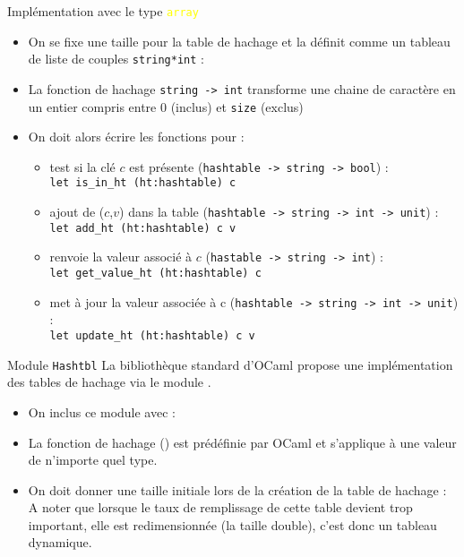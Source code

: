 \documentclass[10pt]{beamer}
\begin{document}
\begin{frame}{\Ctitle}{\stitle}
	\begin{block}{Implémentation avec le type \textcolor{yellow}{\tt array}}
		\begin{itemize}
			\item<1->On se fixe une taille pour la table de hachage et la définit comme un tableau de liste de couples \texttt{string*int} :
			\item<2-> La fonction de hachage {\tt string -> int} transforme une chaine de caractère en un entier compris entre 0 (inclus) et {\tt size} (exclus)
			\item<3-> On doit alors écrire les fonctions pour :
				\begin{itemize}
					\item<4->  test si la clé $c$ est présente ({\tt hashtable -> string -> bool}) : \\
						\texttt{let is_in_ht (ht:hashtable) c}
					\item<5-> ajout de ($c$,$v$) dans la table ({\tt hashtable -> string -> int -> unit}) : \\
						\texttt{let add_ht (ht:hashtable) c v}
					\item<6-> renvoie la valeur associé à $c$ ({\tt hastable -> string -> int}) : \\
						\texttt{let get_value_ht (ht:hashtable) c}
					\item<7-> met à jour la valeur associée  à c ({\tt hashtable -> string -> int -> unit}) : \\
						\texttt{let update_ht (ht:hashtable) c v}
				\end{itemize}
		\end{itemize}
	\end{block}
\end{frame}

\begin{frame}{\Ctitle}{\stitle}
	\begin{block}{Module {\tt Hashtbl}}
		La bibliothèque standard d'OCaml propose une implémentation des tables de hachage via le module .
		\begin{itemize}
			\item<1-> On inclus ce module avec :
			\item<2-> La fonction de hachage () est prédéfinie par OCaml et s'applique à une valeur de n'importe quel type.
			\item<3-> On doit donner une taille initiale lors de la création de la table de hachage :
				A noter que lorsque le taux de remplissage de cette table devient trop important, elle est redimensionnée (la taille double), c'est donc un tableau dynamique.
		\end{itemize}
	\end{block}
\end{frame}
\end{document}
